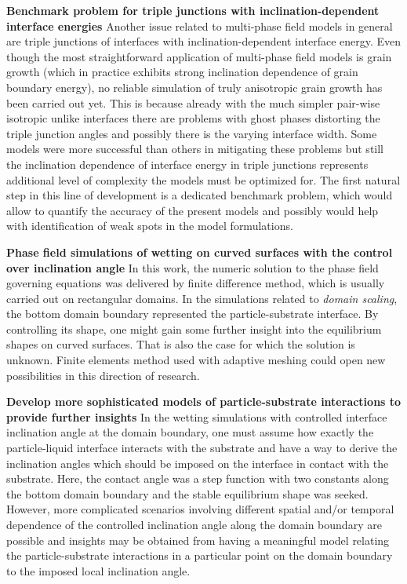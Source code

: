 \textbf{Benchmark problem for triple junctions with inclination-dependent interface energies} Another issue related to multi-phase field models in general are triple junctions of interfaces with inclination-dependent interface energy. Even though the most straightforward application of multi-phase field models is grain growth (which in practice exhibits strong inclination dependence of grain boundary energy), no reliable simulation of truly anisotropic grain growth has been carried out yet. This is because already with the much simpler pair-wise isotropic unlike interfaces there are problems with ghost phases distorting the triple junction angles and possibly there is the varying interface width. Some models were more successful than others in mitigating these problems but still the inclination dependence of interface energy in triple junctions represents additional level of complexity the models must be optimized for. The first natural step in this line of development is a dedicated benchmark problem, which would allow to quantify the accuracy of the present models and possibly would help with identification of weak spots in the model formulations. 

\textbf{Phase field simulations of wetting on curved surfaces with the control over inclination angle} In this work, the numeric solution to the phase field governing equations was delivered by finite difference method, which is usually carried out on rectangular domains. In the simulations related to \textit{domain scaling}, the bottom domain boundary represented the particle-substrate interface. By controlling its shape, one might gain some further insight into the equilibrium shapes on curved surfaces. That is also the case for which the solution is unknown. Finite elements method used with adaptive meshing could open new possibilities in this direction of research.
	
\textbf{Develop more sophisticated models of particle-substrate interactions to provide further insights} In the wetting simulations with controlled interface inclination angle at the domain boundary, one must assume how exactly the particle-liquid interface interacts with the substrate and have a way to derive the inclination angles which should be imposed on the interface in contact with the substrate. Here, the contact angle was a step function with two constants along the bottom domain boundary and the stable equilibrium shape was seeked. However, more complicated scenarios involving different spatial and/or temporal dependence of the controlled inclination angle along the domain boundary are possible and insights may be obtained from having a meaningful model relating the particle-substrate interactions in a particular point on the domain boundary to the imposed local inclination angle.
	
